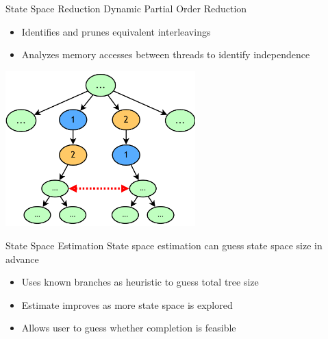 \documentclass[xcolor=dvipsnames]{beamer}
\begin{document}

\begin{frame}{State Space Reduction}
	Dynamic Partial Order Reduction
	\begin{itemize}
		\item Identifies and prunes equivalent interleavings
		\item Analyzes memory accesses between threads to identify independence
	\end{itemize}
	\pause
	\begin{center}
		\includegraphics[width=0.55\textwidth]{dpor.pdf}
	\end{center}

\end{frame}

\begin{frame}{State Space Estimation}
	State space estimation can guess state space size in advance
	\begin{itemize}
		\item Uses known branches as heuristic to guess total tree size
		\item Estimate improves as more state space is explored
		\item Allows user to guess whether completion is feasible
	\end{itemize}

\end{frame}
\end{document}
